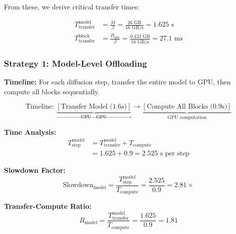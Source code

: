 From these, we derive critical transfer times:

\begin{align}
T_{\text{transfer}}^{\text{model}} &= \frac{M}{\beta} = \frac{26 \text{ GB}}{16 \text{ GB/s}} = 1.625 \text{ s} \label{eq:model_transfer} \\
T_{\text{transfer}}^{\text{block}} &= \frac{B_{\text{size}}}{\beta} = \frac{0.433 \text{ GB}}{16 \text{ GB/s}} = 27.1 \text{ ms} \label{eq:block_transfer}
\end{align}

\subsubsection{Strategy 1: Model-Level Offloading}

\textbf{Timeline:} For each diffusion step, transfer the entire model to GPU, then compute all blocks sequentially.

\begin{equation}
\boxed{
\text{Timeline: } \underbrace{[\text{Transfer Model (1.6s)}]}_{\text{CPU} \to \text{GPU}} \to \underbrace{[\text{Compute All Blocks (0.9s)}]}_{\text{GPU computation}}
}
\end{equation}

\textbf{Time Analysis:}
\begin{align}
T_{\text{step}}^{\text{model}} &= T_{\text{transfer}}^{\text{model}} + T_{\text{compute}} \nonumber \\
&= 1.625 + 0.9 = 2.525 \text{ s per step} \label{eq:model_step_time}
\end{align}

\textbf{Slowdown Factor:}
\begin{equation}
\text{Slowdown}_{\text{model}} = \frac{T_{\text{step}}^{\text{model}}}{T_{\text{compute}}} = \frac{2.525}{0.9} = \boxed{2.81\times}
\label{eq:model_slowdown}
\end{equation}

\textbf{Transfer-Compute Ratio:}
\begin{equation}
R_{\text{model}} = \frac{T_{\text{transfer}}^{\text{model}}}{T_{\text{compute}}} = \frac{1.625}{0.9} = \boxed{1.81}
\label{eq:transfer_compute_ratio}
\end{equation}

